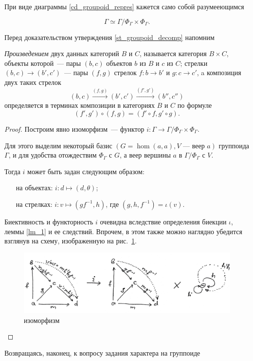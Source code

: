     При виде диаграммы \ref{cd_groupoid_repres} кажется само собой разумееющимся
    \begin{statement}\label{st_groupoid_decomp}
        \begin{equation}
            \Gamma \simeq \textstyle{\Gamma / \Phi_\Gamma \times \Phi_\Gamma}.
        \end{equation}
    \end{statement}

    Перед доказательством утверждения \ref{st_groupoid_decomp} напомним
    \begin{definition}\cite{MacLane}
        \emph{Произведением} двух данных категорий $B$ и $C$, называется 
        категория $B \times C$, объекты которой~--- пары $(b,c)$ объектов $b$ из 
        $B$ и $c$ из $C$; стрелки $(b,c) \to (b',c')$~--- пары $(f,g)$ стрелок 
        $f : b \to b'$ и $g : c \to c'$, a композиция двух таких стрелок
        \[(b,c) \stackrel{(f,g)}{\longrightarrow} (b',c') \stackrel{(f',g')}{\longrightarrow} (b'',c'')\]
        определяется в терминах композиции в категориях $B$ и $C$ по формуле
        \[(f',g') \circ (f,g) = (f' \circ f, g' \circ g).\]
    \end{definition}

    \begin{proof}
    
        Построим явно изоморфизм~--- функтор $i : \Gamma \to 
        \Gamma / \Phi_\Gamma \times \Phi_\Gamma$.

        Для этого выделим некоторый базис $(G = \hom(a,a), V\text{~--- веер } a)$ 
        группоида $\Gamma$, и для удобства отождествим $\Phi_\Gamma$ с $G$, а 
        веер вершины $a$ в $\Gamma / \Phi_\Gamma$ с $V$.

        Тогда $i$ может быть задан следующим образом:
        \begin{itemize}
            \item [на объектах:] $i : d \mapsto (d,\theta)$;
            \item [на стрелках:] $i : v \mapsto (gf^{-1},h)$, где 
            $(g,h,f^{-1}) = \iota(v)$.
        \end{itemize}

        Биективность и функторность $i$ очевидна вследствие определения 
        биекции $\iota$, леммы \ref{lm_1} и ее следствий. Впрочем, в этом также 
        можно наглядно убедится взглянув на схему, 
        изображенную на рис.~\ref{cd_groupoid_iso}.

        \begin{figure}[h]
            \centering
            \includegraphics[width=\textwidth]{pictures/cd_grp_iso.pdf}
            \caption{изоморфизм}
            \label{cd_groupoid_iso}
        \end{figure}
    \end{proof}

        Возвращаясь, наконец, к вопросу задания характера на группоиде